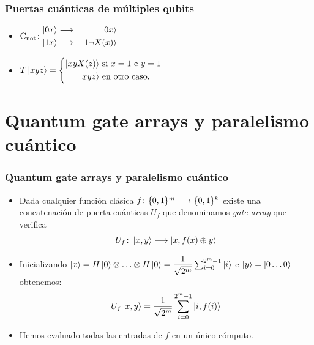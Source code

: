 \documentclass{beamer}
\begin{document}
\begin{frame}
	\frametitle{Puertas cuánticas de múltiples qubits}
	\begin{itemize}
\item<1-> $\mathrm{C_{not}}\colon \begin{aligned}\left|0x\right\rangle&\longrightarrow&\left|0x\right\rangle\\\left|1x\right\rangle&\longrightarrow&\left|1\neg X(x)\right\rangle\end{aligned}$
\item<2-> $T\ket{xyz}=\left\{\begin{aligned}
\ket{xyX(z)}&\mathrm{\ si\ } x=1\mathrm{\ e\ } y=1\\
\ket{xyz}&\mathrm{\ en\ otro\ caso.}\end{aligned}\right.$
\end{itemize}
\end{frame}
\section{Quantum gate arrays y paralelismo cuántico}

\begin{frame}
	\frametitle{Quantum gate arrays y paralelismo cuántico}
	\begin{itemize}
 	\item Dada cualquier función clásica $f\colon \{0,1\}^m\longrightarrow \{0,1\}^k$ existe una concatenación de puerta cuánticas $U_f$ que denominamos \emph{gate array} que verifica
 	$$U_f\colon \left|x,y\right\rangle\longrightarrow \left|x,f(x)\oplus y\right\rangle$$
 	\item Inicializando $\left|x\right\rangle=H\left|0\right\rangle\otimes\hdots\otimes H\left|0\right\rangle=\dfrac{1}{\sqrt{2^m}}\sum_{i=0}^{2^m-1}\left|i\right\rangle$ e $\left|y\right\rangle=\left|0\hdots0\right\rangle$ obtenemos:
 	$$U_f\left|x,y\right\rangle=\dfrac{1}{\sqrt{2^m}}\sum_{i=0}^{2^m-1}\left|i,f(i)\right\rangle$$
 	\item Hemos evaluado todas las entradas de $f$ en un único cómputo.
	\end{itemize}
\end{frame}
\end{document}
